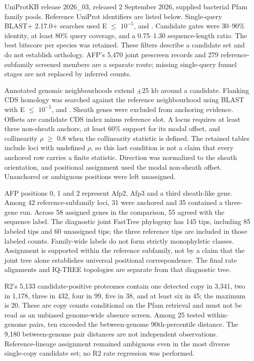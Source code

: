 UniProtKB release 2026\_03, released 2 September 2026, supplied bacterial Pfam family pools. Reference UniProt identifiers are listed below. Single-query BLAST+ 2.17.0+ searches used E \ensuremath{\leq} \(10^{-5}\),  and . Candidate gates were 30--90\% identity, at least 80\% query coverage, and a 0.75--1.30 sequence-length ratio. The best bitscore per species was retained. These filters describe a candidate set and do not establish orthology. AFP's 5,470 joint prescreen records and 279 reference-subfamily screened members are a separate route; missing single-query funnel stages are not replaced by inferred counts.

Annotated genomic neighbourhoods extend \ensuremath{\pm}25 kb around a candidate. Flanking CDS homology was searched against the reference neighbourhood using BLAST with E \ensuremath{\leq} \(10^{-5}\),  and . Sheath genes were excluded from anchoring evidence. Offsets are candidate CDS index minus reference slot. A locus requires at least three non-sheath anchors, at least 60\% support for its modal offset, and collinearity \ensuremath{\rho} \ensuremath{\geq} 0.8 when the collinearity statistic is defined. The retained tables include loci with undefined \ensuremath{\rho}, so this last condition is not a claim that every anchored row carries a finite statistic. Direction was normalized to the sheath orientation, and positional assignment used the modal non-sheath offset. Unanchored or ambiguous positions were left unassigned.

AFP positions 0, 1 and 2 represent Afp2, Afp3 and a third sheath-like gene. Among 42 reference-subfamily loci, 31 were anchored and 35 contained a three-gene run. Across 58 assigned genes in the comparison, 55 agreed with the sequence label. The diagnostic joint FastTree phylogeny has 145 tips, including 85 labeled tips and 60 unassigned tips; the three reference tips are included in those labeled counts. Family-wide labels do not form strictly monophyletic classes. Assignment is supported within the reference subfamily, not by a claim that the joint tree alone establishes universal positional correspondence. The final rate alignments and IQ-TREE topologies are separate from that diagnostic tree.

R2's 5,133 candidate-positive proteomes contain one detected copy in 3,341, two in 1,178, three in 432, four in 99, five in 38, and at least six in 45; the maximum is 20. These are copy counts conditional on the Pfam retrieval and must not be read as an unbiased genome-wide absence screen. Among 25 tested within-genome pairs, ten exceeded the between-genome 90th-percentile distance. The 9,180 between-genome pair distances are not independent observations. Reference-lineage assignment remained ambiguous even in the most diverse single-copy candidate set; no R2 rate regression was performed.

